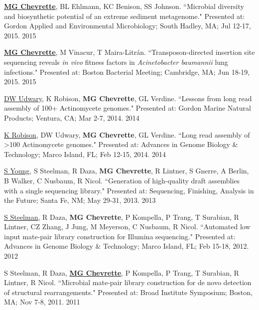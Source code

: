 \begin{cvpubs}
\cvpub
{\textbf{\underline{MG Chevrette}}, BL Ehlmann, KC Benison, SS Johnson. ``Microbial diversity and biosynthetic potential of an extreme sediment metagenome." Presented at: Gordon Applied and Environmental Microbiology; South Hadley, MA; Jul 12-17, 2015.}
{2015}

\cvpub
{\textbf{\underline{MG Chevrette}}, M Vinacur, T Maira-Litr\'{a}n. ``Transposon-directed insertion site sequencing reveals \textit{in vivo} fitness factors in \textit{Acinetobacter baumannii} lung infections." Presented at: Boston Bacterial Meeting; Cambridge, MA; Jun 18-19, 2015.}
{2015}

\cvpub
{\underline{DW Udwary}, K Robison, \textbf{MG Chevrette}, GL Verdine. ``Lessons from long read assembly of 100+ Actinomycete genomes." Presented at: Gordon Marine Natural Products; Ventura, CA; Mar 2-7, 2014.}
{2014}

\end{cvpubs} \begin{cvpubs}

\cvpub
{\underline{K Robison}, DW Udwary, \textbf{MG Chevrette}, GL Verdine. ``Long read assembly of >100 Actinomycete genomes." Presented at: Advances in Genome Biology \& Technology; Marco Island, FL; Feb 12-15, 2014.}
{2014}

\cvpub
{\underline{S Young}, S Steelman, R Daza, \textbf{MG Chevrette}, R Lintner, S Gnerre, A Berlin, B Walker, C Nusbaum, R Nicol. ``Generation of high-quality draft assemblies with a single sequencing library." Presented at: Sequencing, Finishing, Analysis in the Future; Santa Fe, NM; May 29-31, 2013.}
{2013}

\cvpub
{\underline{S Steelman}, R Daza, \textbf{MG Chevrette}, P Kompella, P Trang, T Surabian, R Lintner, CZ Zhang, J Jung, M Meyerson, C Nusbaum, R Nicol. ``Automated low input mate-pair library construction for Illumina sequencing." Presented at: Advances in Genome Biology \& Technology; Marco Island, FL; Feb 15-18, 2012.}
{2012}

\cvpub
{S Steelman, R Daza, \underline{\textbf{MG Chevrette}}, P Kompella, P Trang, T Surabian, R Lintner, R Nicol. ``Microbial mate-pair library construction for de novo detection of structural rearrangements." Presented at: Broad Institute Symposium; Boston, MA; Nov 7-8, 2011.}
{2011}

\end{cvpubs}